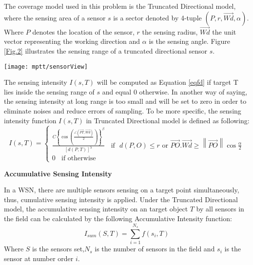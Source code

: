 \documentclass[final]{elsarticle}
\begin{document}
The coverage model used in this problem is the Truncated Directional model, where the sensing area of a sensor $ s $ is a sector denoted by 4-tuple $( P, r, \overrightarrow{Wd}, \alpha )$. Where $ P $ denotes the location of the sensor, $ r $ the sensing radius, $ \overrightarrow{Wd}$ the unit vector representing the working direction and $ \alpha $ is the sensing angle. Figure \ref{Fig.2} illustrates the sensing range of a truncated directional sensor $ s $. 
\begin{figure*}[h]
	\centering
	\texttt{[image: mptt/sensorView]}
	\caption{Sensing capability of directional sensor}
	\label{Fig.2}       %
\end{figure*}
The sensing intensity $I(s,T)$ will be computed as Equation \ref{eqfd} if target T lies inside the sensing range of $s$ and equal 0 otherwise. In another way of saying, the sensing intensity at long range is too small and will be set to zero in order to eliminate noises and reduce errors of sampling. To be more specific, the sensing intensity function $I(s,T)$ in Truncated Directional model is defined as following:
\begin{equation}
I({s},T) = \left\{
\begin{aligned}
 \frac {{C{{\left\{ {\cos \left( {\frac{{\angle (\overrightarrow {PT} ,\overrightarrow {Wd}) }}{2}} \right)} \right\}}}^\beta }} {{{{\left[ {d(P,T)} \right]}^\lambda }}} \:\:\:\:\text{if} \:\:\: d(P,O) \le r \text{ or } \overrightarrow {PO} .\overrightarrow {Wd}  \ge \left\| {\overrightarrow {PO} } \right\|\cos \frac{\alpha}{2} \\
 0 \:\:\:\:\text{if  otherwise}
\end{aligned}
\right.
\end{equation}

\textbf{Accumulative Sensing Intensity}

In a WSN, there are multiple sensors sensing on a target point simultaneously, thus, cumulative sensing intensity is applied. Under the Truncated Directional model, the accumulative sensing intensity on an target object $ T $ by all sensors in the field can be calculated by the following Accumulative Intensity function: 
\begin{equation}
\label{eqia}
I_{sum}(S, T) = \sum\limits_{i = 1}^{N_s} {f({s_i},T)} 
\end{equation}
Where $ S $ is the sensors set,$ N_s $ is the number of sensors in the field and $s_i$ is the sensor at number order $ i $.
\end{document}

